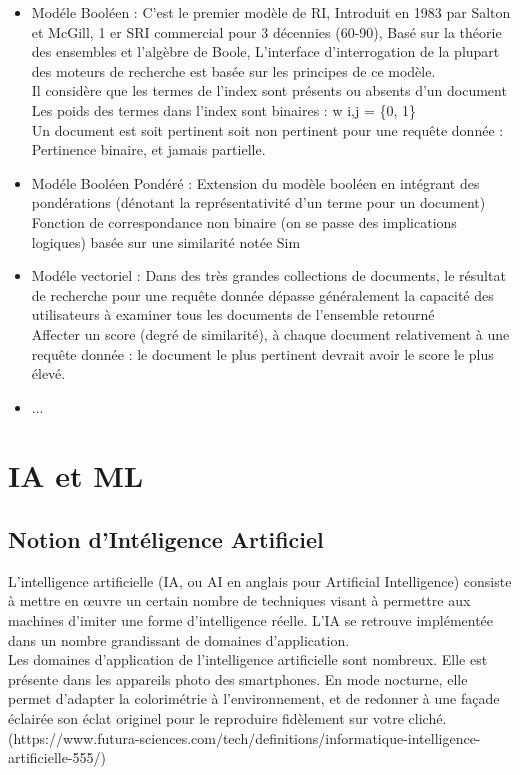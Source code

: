 \documentclass[12pt]{report}
\begin{document}
\begin{itemize}
\item Modéle Booléen : C’est le premier modèle de RI,
Introduit en 1983 par Salton et McGill, 1 er SRI commercial pour 3 décennies (60-90), Basé sur la théorie des ensembles et l’algèbre de Boole, L’interface d’interrogation de la plupart des moteurs de
recherche est basée sur les principes de ce modèle.\\
Il considère que les termes de l’index sont présents ou
absents d’un document\\
Les poids des termes dans l’index sont binaires : w i,j = \{0, 1\}\\
Un document est soit pertinent soit non pertinent pour une
requête donnée : Pertinence binaire, et jamais partielle.

\item Modéle Booléen Pondéré : Extension du modèle booléen en intégrant des
pondérations (dénotant la représentativité d’un terme
pour un document) \\
Fonction de correspondance non binaire (on se passe des
implications logiques) basée sur une similarité notée Sim

\item Modéle vectoriel : Dans des très grandes collections de documents, le
résultat de recherche pour une requête donnée dépasse
généralement la capacité des utilisateurs à examiner tous
les documents de l’ensemble retourné\\ Affecter un score (degré de similarité), à chaque document
relativement à une requête donnée : le document le plus
pertinent devrait avoir le score le plus élevé.
\item ...
\end{itemize}
\section{IA et ML}

\subsection{Notion d'Intéligence Artificiel}

L'intelligence artificielle (IA, ou AI en anglais pour Artificial Intelligence) consiste à mettre en œuvre un certain nombre de techniques visant à permettre aux machines d'imiter une forme d'intelligence réelle. L'IA se retrouve implémentée dans un nombre grandissant de domaines d'application.\\
Les domaines d'application de l'intelligence artificielle sont nombreux. Elle est présente dans les appareils photo des smartphones. En mode nocturne, elle permet d'adapter la colorimétrie à l'environnement, et de redonner à une façade éclairée son éclat originel pour le reproduire fidèlement sur votre cliché.
\\(https://www.futura-sciences.com/tech/definitions/informatique-intelligence-artificielle-555/)
\end{document}
